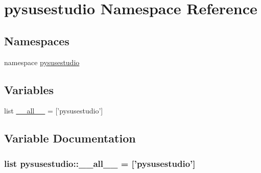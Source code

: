 \hypertarget{namespacepysusestudio}{
\section{pysusestudio Namespace Reference}
\label{namespacepysusestudio}
}
\subsection*{Namespaces}
\begin{DoxyCompactItemize}
\item 
namespace \hyperlink{namespacepysusestudio_1_1pysusestudio}{pysusestudio}
\end{DoxyCompactItemize}
\subsection*{Variables}
\begin{DoxyCompactItemize}
\item 
list \hyperlink{namespacepysusestudio_aac9215cce597c3e59557b2f82cba9f45}{\_\-\_\-all\_\-\_\-} = \mbox{[}'pysusestudio'\mbox{]}
\end{DoxyCompactItemize}


\subsection{Variable Documentation}
\hypertarget{namespacepysusestudio_aac9215cce597c3e59557b2f82cba9f45}{
\subsubsection[{\_\-\_\-all\_\-\_\-}]{\setlength{\rightskip}{0pt plus 5cm}list {\bf pysusestudio::\_\-\_\-all\_\-\_\-} = \mbox{[}'pysusestudio'\mbox{]}}}
\label{namespacepysusestudio_aac9215cce597c3e59557b2f82cba9f45}

